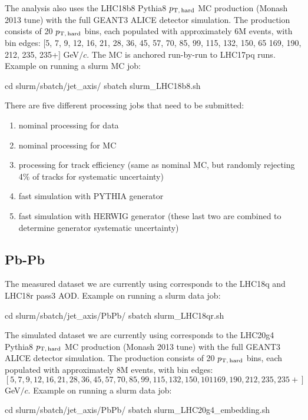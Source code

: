 \documentclass[12pt]{article}
\newcommand{\pThard}{$p_{\rm T, \, hard}$}
\newcommand{\GeVc}{GeV$/c$}
\begin{document}
The analysis also uses the LHC18b8 Pythia8 \pThard{} MC production (Monash 2013 tune) with the full
GEANT3 ALICE detector simulation. The production consists of 20 \pThard{} bins, each populated with
approximately 6M events, with bin edges: $[$5, 7, 9, 12, 16, 21, 28, 36, 45, 57, 70, 85, 99, 115, 132, 150,
65 169, 190, 212, 235, 235+$]$ \GeVc. The MC is anchored run-by-run to LHC17pq runs.
Example on running a slurm MC job:
\begin{tcolorbox}
\begin{verbnobox}[\scriptsize]
cd slurm/sbatch/jet_axis/
sbatch slurm_LHC18b8.sh
\end{verbnobox}  
\end{tcolorbox}

There are five different processing jobs that need to be submitted:
\begin{enumerate}
\item nominal processing for data
\item nominal processing for MC
\item processing for track efficiency (same as nominal MC, but randomly rejecting 4$\%$ of tracks for systematic uncertainty)
\item fast simulation with PYTHIA generator
\item fast simulation with HERWIG generator (these last two are combined to determine generator systematic uncertainty)
\end{enumerate}

\subsection{Pb-Pb}

The measured dataset we are currently using corresponds to the LHC18q and LHC18r pass3 AOD.
Example on running a slurm data job:
\begin{tcolorbox}
\begin{verbnobox}[\scriptsize]
cd slurm/sbatch/jet_axis/PbPb/
sbatch slurm_LHC18qr.sh
\end{verbnobox}  
\end{tcolorbox}

The simulated dataset we are currently using corresponds to the LHC20g4 Pythia8 \pThard{} MC production (Monash 2013 tune) with the full
GEANT3 ALICE detector simulation. The production consists of 20 \pThard{} bins, each populated with
approximately 8M events, with bin edges: $[5, 7, 9, 12, 16, 21, 28, 36, 45, 57, 70, 85, 99, 115, 132, 150, 101 169, 190, 212, 235, 235+]$ \GeVc. 
Example on running a slurm data job:
\begin{tcolorbox}
\begin{verbnobox}[\scriptsize]
cd slurm/sbatch/jet_axis/PbPb/
sbatch slurm_LHC20g4_embedding.sh
\end{verbnobox}  
\end{tcolorbox}
\end{document}
